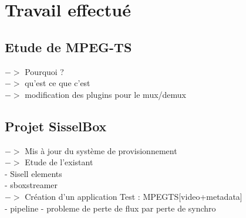 \section{Travail effectué}

\subsection{Etude de MPEG-TS}
         $->$ Pourquoi ? \\
         $->$ qu'est ce que c'est\\
         $->$ modification des plugins pour le mux/demux\\

\subsection{Projet SisselBox}
         $->$ Mis à jour du système de provisionnement\\
         $->$ Etude de l'existant\\
             - Sisell elements\\
             - sboxstreamer\\
         $->$ Création d'un application Test : MPEGTS[video+metadata]\\
              - pipeline
              - probleme de perte de flux par perte de synchro
